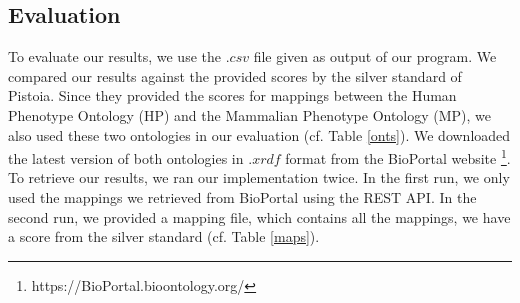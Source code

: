 \documentclass[runningheads]{llncs}
\begin{document}
\subsection{Evaluation} \label{evaluation}
To evaluate our results, we use the $.csv$ file given as output of our program. We compared our results against the provided scores by the silver standard of Pistoia. Since they provided the scores for mappings between the Human Phenotype Ontology (HP) and the Mammalian Phenotype Ontology (MP), we also used these two ontologies in our evaluation (cf. Table \ref{onts}). We downloaded the latest version of both ontologies in $.xrdf$ format from the BioPortal website \footnote{https://BioPortal.bioontology.org/}. To retrieve our results, we ran our implementation twice. In the first run, we only used the mappings we retrieved from BioPortal using the REST API. In the second run, we provided a mapping file, which contains all the mappings, we have a score from the silver standard (cf. Table \ref{maps}). 
\end{document}
